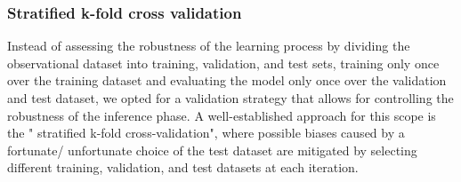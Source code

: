\subsubsection{Stratified k-fold cross validation}

Instead of assessing the robustness of the learning process by dividing the observational dataset into training, validation, and test sets, training only once over the training dataset and evaluating the model only once over the validation and test dataset, we opted for a validation strategy that allows for controlling the robustness of the inference phase. A well-established approach for this scope is the " stratified k-fold cross-validation", where possible biases caused by a fortunate/ unfortunate choice of the test dataset are mitigated by selecting different training, validation, and test datasets at each iteration. 
